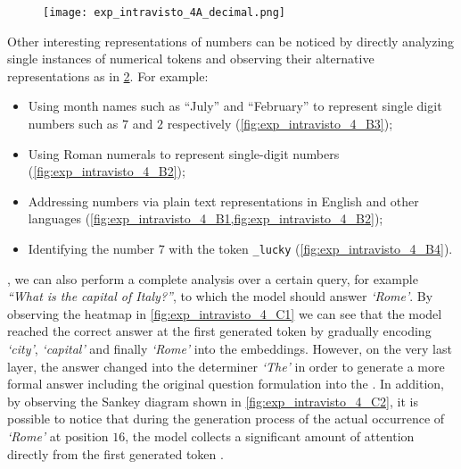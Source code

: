 \begin{figure}[t!]
    \centering
    \texttt{[image: exp\_intravisto\_4A\_decimal.png]}
    \caption{}
    \label{fig:exp_intravisto_4_A}
\end{figure}

Other interesting representations of numbers can be noticed by directly analyzing single instances of numerical tokens and observing their alternative representations as in \cref{fig:exp_intravisto_4_B}.
For example:
\begin{itemize}
    \item Using month names such as ``July'' and ``February'' to represent single digit numbers such as $7$ and $2$ respectively (\cref{fig:exp_intravisto_4_B3});
    \item Using Roman numerals to represent single-digit numbers (\cref{fig:exp_intravisto_4_B2});
    \item Addressing numbers via plain text representations in English and other languages (\cref{fig:exp_intravisto_4_B1,fig:exp_intravisto_4_B2});
    \item Identifying the number $7$ with the token \texttt{\_lucky} (\cref{fig:exp_intravisto_4_B4}).
\end{itemize}

\begin{figure}[t!]
    \centering
    \quad
    \caption{}
    \label{fig:exp_intravisto_4_B}
\end{figure}

, we can also perform a complete analysis over a certain query, for example \emph{``What is the capital of Italy?''}, to which the model should answer \emph{`Rome'}.
By observing the heatmap in \cref{fig:exp_intravisto_4_C1} we can see that the model reached the correct answer at the first generated token by gradually encoding \emph{`city'}, \emph{`capital'} and finally \emph{`Rome'} into the embeddings.
However, on the very last layer, the answer changed into the determiner \emph{`The'} in order to generate a more formal answer including the original question formulation into the .
In addition, by observing the Sankey diagram shown in \cref{fig:exp_intravisto_4_C2}, it is possible to notice that during the generation process of the actual occurrence of \emph{`Rome'} at position $16$, the model collects a significant amount of attention directly from the first generated token .

